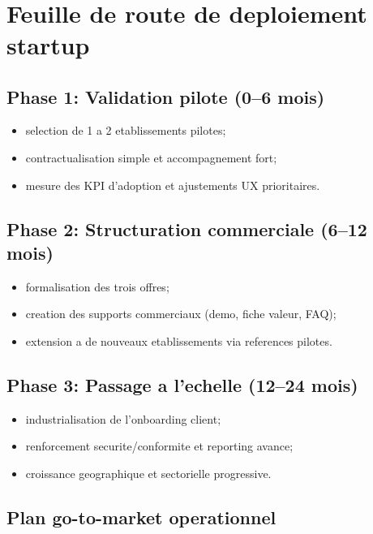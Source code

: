﻿﻿\documentclass[12pt,a4paper,oneside]{report}
\begin{document}
\section{Feuille de route de deploiement startup}

\subsection{Phase 1: Validation pilote (0--6 mois)}

\begin{itemize}
  \item selection de 1 a 2 etablissements pilotes;
  \item contractualisation simple et accompagnement fort;
  \item mesure des KPI d'adoption et ajustements UX prioritaires.
\end{itemize}

\subsection{Phase 2: Structuration commerciale (6--12 mois)}

\begin{itemize}
  \item formalisation des trois offres;
  \item creation des supports commerciaux (demo, fiche valeur, FAQ);
  \item extension a de nouveaux etablissements via references pilotes.
\end{itemize}

\subsection{Phase 3: Passage a l'echelle (12--24 mois)}

\begin{itemize}
  \item industrialisation de l'onboarding client;
  \item renforcement securite/conformite et reporting avance;
  \item croissance geographique et sectorielle progressive.
\end{itemize}

\subsection{Plan go-to-market operationnel}
\end{document}
